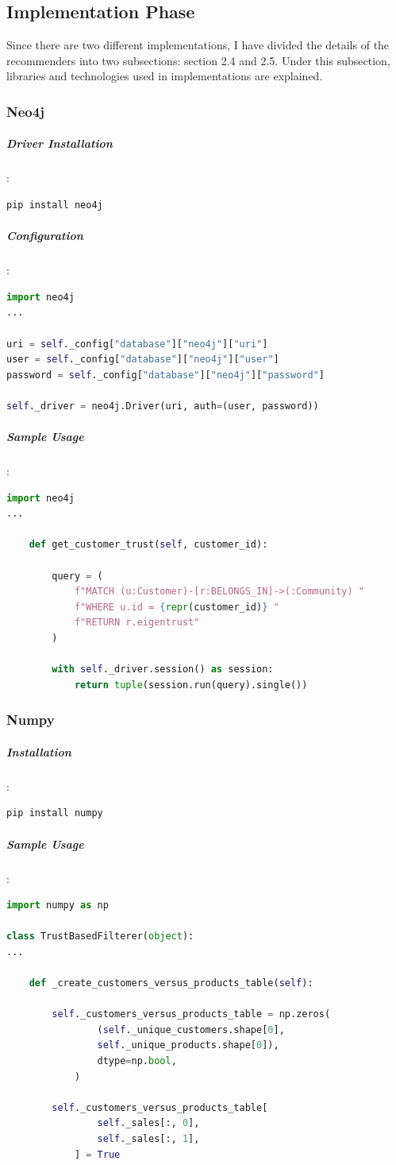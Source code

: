 \documentclass[12pt]{article}
\begin{document}
\subsection{Implementation Phase}
Since there are two different implementations, I have divided the details of the recommenders into two subsections: section 2.4 and 2.5. Under this subsection, libraries and technologies used in implementations are explained.
\subsubsection{Neo4j}
\subparagraph{Driver Installation}:
\begin{lstlisting}[language=bash]
pip install neo4j
\end{lstlisting}

\subparagraph{Configuration}:
\begin{lstlisting}[language=python]
import neo4j
...

uri = self._config["database"]["neo4j"]["uri"]
user = self._config["database"]["neo4j"]["user"]
password = self._config["database"]["neo4j"]["password"]

self._driver = neo4j.Driver(uri, auth=(user, password))

\end{lstlisting}

\subparagraph{Sample Usage}:
\begin{lstlisting}[language=python, caption=Neo4j driver example]
import neo4j
...

	def get_customer_trust(self, customer_id):

		query = (
			f"MATCH (u:Customer)-[r:BELONGS_IN]->(:Community) "
			f"WHERE u.id = {repr(customer_id)} "
			f"RETURN r.eigentrust"
		)

		with self._driver.session() as session:
			return tuple(session.run(query).single())

\end{lstlisting}

\subsubsection{Numpy}
\subparagraph{Installation}:
\begin{lstlisting}[language=bash]
pip install numpy
\end{lstlisting}

\subparagraph{Sample Usage}:
\begin{lstlisting}[language=python, caption=Numpy example]
import numpy as np

class TrustBasedFilterer(object):
...

	def _create_customers_versus_products_table(self):

		self._customers_versus_products_table = np.zeros(
				(self._unique_customers.shape[0],
				self._unique_products.shape[0]),
				dtype=np.bool,
			)
			
		self._customers_versus_products_table[
				self._sales[:, 0],
				self._sales[:, 1],
			] = True
\end{lstlisting}
\end{document}
